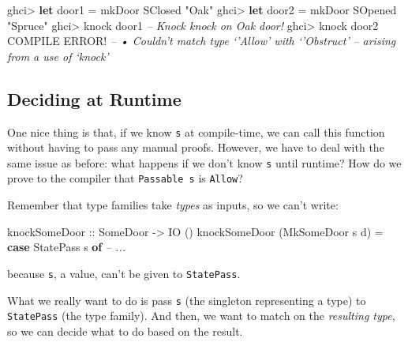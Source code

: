 \documentclass[]{article}
\newenvironment{Shaded}{}{}
\newcommand{\CommentTok}[1]{\textcolor[rgb]{0.38,0.63,0.69}{\textit{#1}}}
\newcommand{\DataTypeTok}[1]{\textcolor[rgb]{0.56,0.13,0.00}{#1}}
\newcommand{\FunctionTok}[1]{\textcolor[rgb]{0.02,0.16,0.49}{#1}}
\newcommand{\KeywordTok}[1]{\textcolor[rgb]{0.00,0.44,0.13}{\textbf{#1}}}
\newcommand{\NormalTok}[1]{#1}
\newcommand{\OtherTok}[1]{\textcolor[rgb]{0.00,0.44,0.13}{#1}}
\newcommand{\StringTok}[1]{\textcolor[rgb]{0.25,0.44,0.63}{#1}}
\begin{document}
\begin{Shaded}
\begin{Highlighting}[]
\NormalTok{ghci}\FunctionTok{>} \KeywordTok{let}\NormalTok{ door1 }\FunctionTok{=}\NormalTok{ mkDoor }\DataTypeTok{SClosed} \StringTok{"Oak"}
\NormalTok{ghci}\FunctionTok{>} \KeywordTok{let}\NormalTok{ door2 }\FunctionTok{=}\NormalTok{ mkDoor }\DataTypeTok{SOpened} \StringTok{"Spruce"}
\NormalTok{ghci}\FunctionTok{>}\NormalTok{ knock door1}
\CommentTok{-- Knock knock on Oak door!}
\NormalTok{ghci}\FunctionTok{>}\NormalTok{ knock door2}
\DataTypeTok{COMPILE} \DataTypeTok{ERROR}\FunctionTok{!}
\CommentTok{--     • Couldn't match type ‘'Allow’ with ‘'Obstruct’}
\CommentTok{--             arising from a use of ‘knock’}
\end{Highlighting}
\end{Shaded}

\hypertarget{deciding-at-runtime}{%
\subsection{Deciding at Runtime}\label{deciding-at-runtime}}

One nice thing is that, if we know \texttt{s} at compile-time, we can call this
function without having to pass any manual proofs. However, we have to deal with
the same issue as before: what happens if we don't know \texttt{s} until
runtime? How do we prove to the compiler that \texttt{Passable\ s} is
\texttt{\textquotesingle{}Allow}?

Remember that type families take \emph{types} as inputs, so we can't write:

\begin{Shaded}
\begin{Highlighting}[]
\OtherTok{knockSomeDoor ::} \DataTypeTok{SomeDoor} \OtherTok{->} \DataTypeTok{IO}\NormalTok{ ()}
\NormalTok{knockSomeDoor (}\DataTypeTok{MkSomeDoor}\NormalTok{ s d) }\FunctionTok{=}
    \KeywordTok{case} \DataTypeTok{StatePass}\NormalTok{ s }\KeywordTok{of}
      \CommentTok{-- ...}
\end{Highlighting}
\end{Shaded}

because \texttt{s}, a value, can't be given to \texttt{StatePass}.

What we really want to do is pass \texttt{s} (the singleton representing a type)
to \texttt{StatePass} (the type family). And then, we want to match on the
\emph{resulting type}, so we can decide what to do based on the result.
\end{document}

